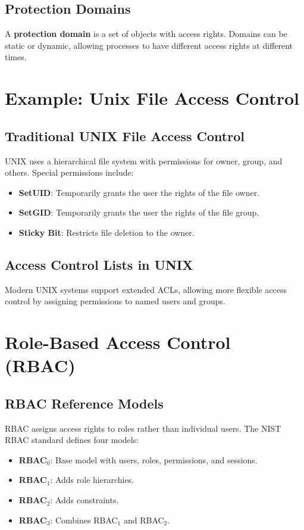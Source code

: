 \documentclass{article}
\begin{document}
\subsection{Protection Domains}
A \textbf{protection domain} is a set of objects with access rights. Domains can be static or dynamic, allowing processes to have different access rights at different times.

\section{Example: Unix File Access Control}
\subsection{Traditional UNIX File Access Control}
UNIX uses a hierarchical file system with permissions for owner, group, and others. Special permissions include:
\begin{itemize}
    \item \textbf{SetUID}: Temporarily grants the user the rights of the file owner.
    \item \textbf{SetGID}: Temporarily grants the user the rights of the file group.
    \item \textbf{Sticky Bit}: Restricts file deletion to the owner.
\end{itemize}

\subsection{Access Control Lists in UNIX}
Modern UNIX systems support extended ACLs, allowing more flexible access control by assigning permissions to named users and groups.

\section{Role-Based Access Control (RBAC)}
\subsection{RBAC Reference Models}
RBAC assigns access rights to roles rather than individual users. The NIST RBAC standard defines four models:
\begin{itemize}
    \item \textbf{RBAC$_0$}: Base model with users, roles, permissions, and sessions.
    \item \textbf{RBAC$_1$}: Adds role hierarchies.
    \item \textbf{RBAC$_2$}: Adds constraints.
    \item \textbf{RBAC$_3$}: Combines RBAC$_1$ and RBAC$_2$.
\end{itemize}
\end{document}
